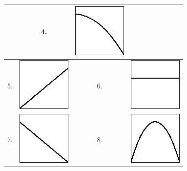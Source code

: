 \begin{enumerate}[1.]
\begin{multicols}{2}
\begin{Question}
\begin{center}
\begin{center}
\begin{tabular}{|c|c|c|c|}
 &4. &\includegraphics[width=0.20\linewidth]{graphics/Week01_DerivativeDefinition/aableson-4855-setUnit_02_DerivativeDefinitionprob1image5}
 \\ \hline 
5. &\includegraphics[width=0.20\linewidth]{graphics/Week01_DerivativeDefinition/aableson-4855-setUnit_02_DerivativeDefinitionprob1image1}
 &6. &\includegraphics[width=0.20\linewidth]{graphics/Week01_DerivativeDefinition/aableson-4855-setUnit_02_DerivativeDefinitionprob1image2}
 \\ \hline 
 7. &\includegraphics[width=0.20\linewidth]{graphics/Week01_DerivativeDefinition/aableson-4855-setUnit_02_DerivativeDefinitionprob1image3}
 &8. &\includegraphics[width=0.20\linewidth]{graphics/Week01_DerivativeDefinition/aableson-4855-setUnit_02_DerivativeDefinitionprob1image8}
 \\ \hline 
\end {tabular}\end{center}\par\smallskip
\end{center} 
\par 
\par  \end{Question}
\begin{Solution}
 

\end{Solution}
\end{multicols}
\end{enumerate}
